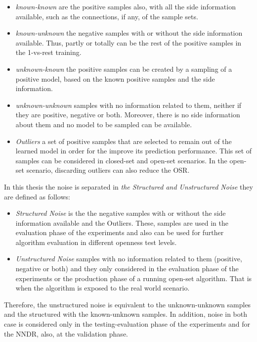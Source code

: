 \begin{itemize}
    \item \textit{known-known} are the positive samples also, with all the side information available, such as the connections, if any, of the sample sets.
    \item \textit{known-unknown} the negative samples with or without the side information available. Thus, partly or totally can be the rest of the positive samples in the 1-vs-rest training.
    \item \textit{unknown-known} the positive samples can be created by a sampling of a positive model, based on the known positive samples and the side information.
    \item \textit{unknown-unknown} samples with no information related to them, neither if they are positive, negative or both. Moreover, there is no side information about them and no model to be sampled can be available. 
    \item \textit{Outliers} a set of positive samples that are selected to remain out of the learned model in order for the improve its prediction performance. This set of samples can be considered in closed-set and open-set scenarios. In the open-set scenario, discarding outliers can also reduce the OSR.
\end{itemize}


In this thesis the noise is separated in \textit{the Structured and Unstructured Noise} they are defined as follows:

\begin{itemize}
    \item \textit{Structured Noise} is the the negative samples with or without the side information available and the Outliers. These, samples are used in the evaluation phase of the experiments and also can be used for further algorithm evaluation in different openness test levels.
    \item \textit{Unstructured Noise} samples with no information related to them (positive, negative or both) and they only considered in the evaluation phase of the experiments or the production phase of a running open-set algorithm. That is when the algorithm is exposed to the real world scenario.
\end{itemize}

Therefore, the unstructured noise is equivalent to the unknown-unknown samples and the structured with the known-unknown samples. In addition, noise in both case is considered only in the testing-evaluation phase of the experiments and for the NNDR, also, at the validation phase.

